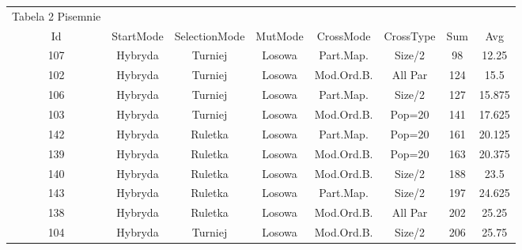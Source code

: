 \documentclass{article}
\begin{document}
\begin{table}[h!]
	\centering
	\begin{tabular}{c||c|c|c|c|c||c|c}
Tabela 2 Pisemnie\\
Id & StartMode & SelectionMode & MutMode & CrossMode & CrossType & Sum & Avg \\
\hline
107 & Hybryda & Turniej & Losowa & Part.Map. & Size/2 & 98 & 12.25 \\
102 & Hybryda & Turniej & Losowa & Mod.Ord.B. & All Par & 124 & 15.5 \\
106 & Hybryda & Turniej & Losowa & Part.Map. & Size/2 & 127 & 15.875 \\
103 & Hybryda & Turniej & Losowa & Mod.Ord.B. & Pop=20 & 141 & 17.625 \\
142 & Hybryda & Ruletka & Losowa & Part.Map. & Pop=20 & 161 & 20.125 \\
139 & Hybryda & Ruletka & Losowa & Mod.Ord.B. & Pop=20 & 163 & 20.375 \\
140 & Hybryda & Ruletka & Losowa & Mod.Ord.B. & Size/2 & 188 & 23.5 \\
143 & Hybryda & Ruletka & Losowa & Part.Map. & Size/2 & 197 & 24.625 \\
138 & Hybryda & Ruletka & Losowa & Mod.Ord.B. & All Par & 202 & 25.25 \\
104 & Hybryda & Turniej & Losowa & Mod.Ord.B. & Size/2 & 206 & 25.75 \\
	\end{tabular}
\end{table}
\end{document}
